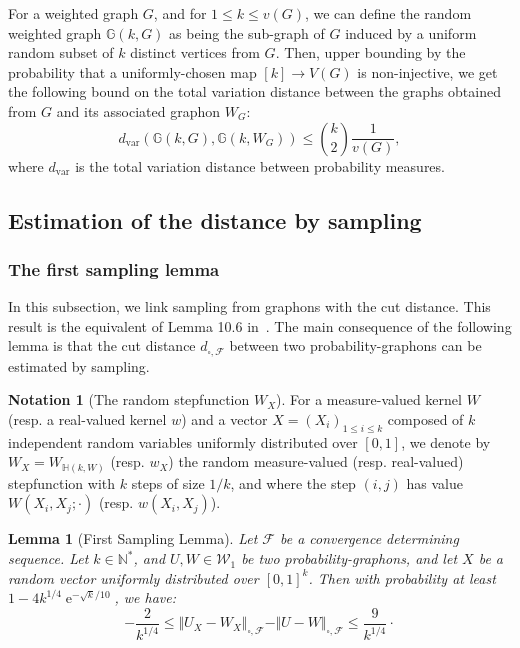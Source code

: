 \documentclass{amsart}
\theoremstyle{plain}
\newtheorem{lemme}[Th]{Lemma}
\theoremstyle{definition}
\newtheorem{notation}[Th]{Notation}
\newcommand{\Graphon}{\mathcal{W}_1}
\newcommand{\dcutF}{d_{\square,\mathcal{F}}}
\newcommand{\NcutF}[1]{\Vert#1\Vert_{\square,\mathcal{F}}}
\newcommand{\F}{\mathcal{F}}
\newcommand{\N}{\mathbb{N}}
\DeclareMathOperator{\e}{e}
\begin{document}
For a weighted graph $G$, and for $1\leq k \leq v(G)$,
we can define the random weighted graph $\mathbb{G}(k,G)$
as being the sub-graph of $G$ induced by a uniform random subset of $k$
distinct  vertices from $G$.
Then, upper bounding by the probability that a uniformly-chosen map $[k]\to V(G)$ is non-injective, 
we get the following bound on the total variation distance between the graphs
obtained from $G$ and its associated graphon $W_G$:
\begin{equation*}
	d_{\text{var}}(\mathbb{G}(k,G),\mathbb{G}(k,W_G)) \leq {k \choose 2} \frac{1}{v(G)} 	,
\end{equation*}
where $d_{\text{var}}$ is the total variation distance between probability measures.



\subsection{Estimation of the distance by sampling}

\subsubsection{The first sampling lemma}

In this subsection, we link
sampling from graphons with the cut distance.
This result is the equivalent of Lemma 10.6 in~\cite{Lovasz}.
The main consequence of the following lemma is that 
the cut distance $\dcutF$ between two probability-graphons
can be estimated by sampling.


\begin{notation}[The random stepfunction $W_X$]
For a measure-valued kernel $W$ (resp. a real-valued kernel $w$)
and a vector $X=(X_i)_{1\leq i \leq k}$ composed of 
$k$ independent random variables uniformly distributed over $[0,1]$,
we denote by $W_X=W_{\mathbb{H}(k,W)}$ (resp. $w_X$)
the random measure-valued (resp. real-valued) stepfunction 
with $k$ steps of size $1/k$,
and where the step $(i,j)$ has value $W(X_i,X_j;\cdot)$ (resp. $w(X_i,X_j)$).
\end{notation}

\begin{lemme}[First Sampling Lemma]\label{FirstSamplingLemma}
Let $\F$ be a convergence determining sequence.
Let $k\in\N^*$, and $U,W\in\Graphon$ be two probability-graphons,
and let $X$ be a random vector uniformly distributed over $[0,1]^k$.
Then with probability at least $1-4 k^{1/4} \e^{-\sqrt{k}/10}$, we have:
\[ -\frac{2}{k^{1/4}} \leq \NcutF{U_X - W_X} - \NcutF{U-W} \leq \frac{9}{k^{1/4}}  \cdot\]
\end{lemme}
\end{document}
